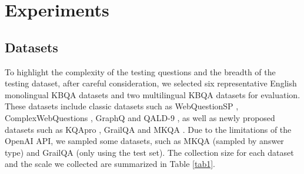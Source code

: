 \documentclass[runningheads]{llncs}
\begin{document}
\section{Experiments}
\subsection{Datasets}
To highlight the complexity of the testing questions and the breadth of the testing dataset, after careful consideration, we selected six representative English monolingual KBQA datasets and two multilingual KBQA datasets for evaluation. These datasets include classic datasets such as WebQuestionSP \cite{yih2016value}, ComplexWebQuestions \cite{talmor2018web}, GraphQ \cite{su2016generating} and QALD-9 \cite{ngomo20189th}, as well as newly proposed datasets such as KQApro \cite{cao2022kqa},  GrailQA \cite{gu2021beyond} and MKQA \cite{longpre2021mkqa}. Due to the limitations of the OpenAI API, we sampled some datasets, such as MKQA (sampled by answer type) and GrailQA (only using the test set). The collection size for each dataset and the scale we collected are summarized in Table \ref{tab1}.


\begin{table}[t]\centering
\caption{The Statistical of collected KB-based CQA datasets, "Col. Size" represents the size of the dataset we collected in our experiments. "Size" denotes the original size of the dataset.}\label{tab1}
\end{table}
\end{document}
